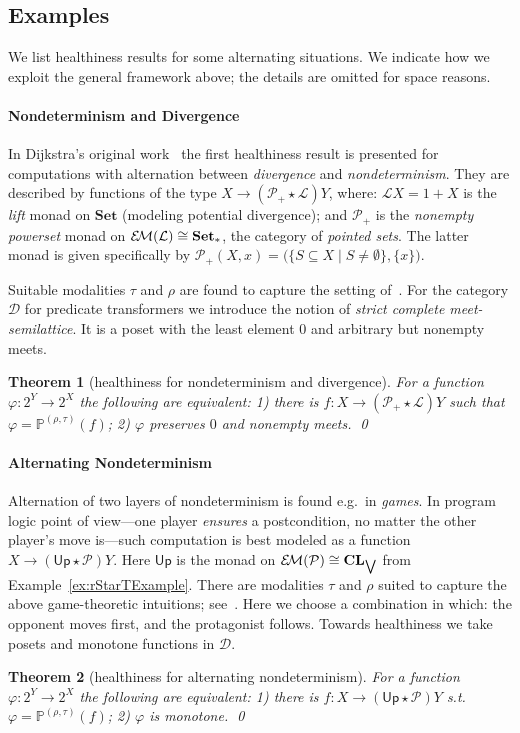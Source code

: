 \documentclass[9pt, preprint]{sigplanconf}
\theoremstyle{theorem}
\newtheorem{theorem}{Theorem}[section]
\theoremstyle{definition}
\newcommand{\cat}[1]{\mathcal{#1}}
\renewcommand{\phi}{\varphi}
\newcommand{\pow}{\mathcal{P}}
\newcommand{\Set}{\mathbf{Set}}
\newcommand{\Sets}{\Set}
\newcommand{\CL}{\mathbf{CL}}
\newcommand{\EM}{\mathcal{E}{\kern-.5ex}\mathcal{M}}
\newcommand{\biglor}{\bigvee}
\newcommand{\Upx}{\mathsf{Up}}
\newcommand{\bbP}{\mathbb{P}}
\newcommand{\lift}{\mathcal{L}}
\begin{document}
\subsection{Examples}\label{sub:alternatingExamples}
We list  healthiness results for some alternating situations.
  We indicate how we exploit the
general framework above; the details are omitted for space reasons.


\paragraph{Nondeterminism and Divergence}
In Dijkstra's original work~\cite{Dijkstra76} the first healthiness
result is presented for computations with alternation between
\emph{divergence} and \emph{nondeterminism}. They are described by
functions of the type $X\to (\pow_{+}\star\lift) Y$, where: $\lift X=1+X$ is
the \emph{lift} monad on $\Sets$ (modeling potential divergence); and
$\pow_{+}$ is the \emph{nonempty powerset} monad on
$\EM(\lift)\cong\Sets_{*}$, the category of \emph{pointed sets}. The
latter monad is given specifically by $\pow_{+}(X,x)=\bigl(\{S\subseteq
X\mid S\neq \emptyset\}, \{x\}\bigr)$.

Suitable modalities $\tau$ and
$\rho$ are found to capture the setting of~\cite{Dijkstra76}.
For the category $\cat{D}$ for predicate transformers we introduce
the notion of \emph{strict complete meet-semilattice}. It is a poset
with
the least element $0$ and
arbitrary but nonempty meets.


\begin{theorem}[healthiness for  nondeterminism and divergence]
  For a function
  $\varphi \colon 2^Y \to 2^X$ the following are equivalent: 1)
  there is  $f\colon X \to (\pow_+ \star\lift) Y$ such that
  $\varphi = \bbP^{(\rho, \tau)}(f)$; 2) $\phi$
  preserves $0$ and nonempty meets.
  \qed
\end{theorem}



\paragraph{Alternating Nondeterminism}
Alternation of two layers of nondeterminism is found e.g.\ in \emph{games}. In
program logic point of view---one player  \emph{ensures} a
postcondition, no matter the other player's move is---such computation
is best modeled as a function $X\to (\Upx\star\pow) Y$. Here $\Upx$ is the monad
on $\EM(\pow)\cong \CL_{\biglor}$ from Example~\ref{ex:rStarTExample}.
There are  modalities $\tau$ and
$\rho$ suited to capture the above game-theoretic intuitions;
see~\cite{Hasuo15TCS}. Here we choose a combination in which: the
opponent moves first, and the protagonist follows.
Towards healthiness we take posets and monotone functions in
$\cat{D}$.
\begin{theorem}[healthiness for alternating nondeterminism]
  For a function
  $\varphi \colon 2^Y \to 2^X$ the following are equivalent:
  1) there is  $f \colon X \to (\Upx\star\pow) Y$ s.t.\
  $\varphi = \bbP^{(\rho, \tau)}(f)$; 2) $\phi$ is monotone. \qed
\end{theorem}
\end{document}
